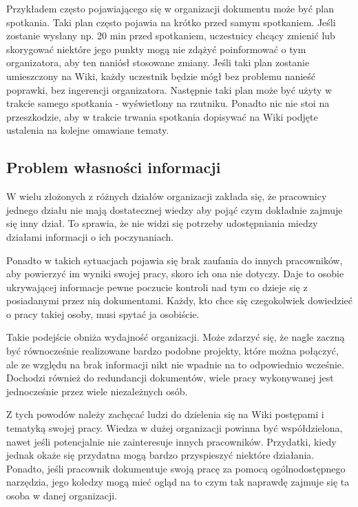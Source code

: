 \documentclass{article}
\begin{document}
	Przykładem często pojawiającego się w organizacji dokumentu może być plan spotkania. Taki plan często pojawia na krótko przed samym spotkaniem. Jeśli zostanie wysłany np. 20 min przed spotkaniem, uczestnicy chcący zmienić lub skorygować niektóre jego punkty mogą nie zdążyć poinformować o tym organizatora, aby ten naniósł stosowane zmiany. Jeśli taki plan zostanie umieszczony na Wiki, każdy uczestnik będzie mógł bez problemu nanieść poprawki, bez ingerencji organizatora. Następnie taki plan może być użyty w trakcie samego spotkania - wyświetlony na rzutniku. Ponadto nic nie stoi na przeszkodzie, aby w trakcie trwania spotkania dopisywać na Wiki podjęte ustalenia na kolejne omawiane tematy.   
	
	\subsection{Problem własności informacji}

	W wielu złożonych z różnych działów organizacji zakłada się, że pracownicy jednego działu nie mają dostatecznej wiedzy aby pojąć czym dokładnie zajmuje się inny dział. To sprawia, że nie widzi się potrzeby udostępniania miedzy działami informacji o ich poczynaniach. 

	Ponadto w takich sytuacjach pojawia się brak zaufania do innych pracowników, aby powierzyć im wyniki swojej pracy, skoro ich ona nie dotyczy. Daje to osobie ukrywającej informacje pewne poczucie kontroli nad tym co dzieje się z posiadanymi przez nią dokumentami. Każdy, kto chce się czegokolwiek dowiedzieć o pracy takiej osoby, musi spytać ja osobiście. 

	Takie podejście obniża wydajność organizacji. Może zdarzyć się, że nagle zaczną być równocześnie realizowane bardzo podobne projekty, które można połączyć, ale ze względu na brak informacji nikt nie wpadnie na to odpowiednio wcześnie. Dochodzi również do redundancji dokumentów, wiele pracy wykonywanej jest jednocześnie przez wiele niezależnych osób.

	Z tych powodów należy zachęcać ludzi do dzielenia się na Wiki postępami i tematyką swojej pracy. Wiedza w dużej organizacji powinna być współdzielona, nawet jeśli potencjalnie nie zainteresuje innych pracowników. Przydatki, kiedy jednak okaże się przydatna mogą bardzo przyspieszyć niektóre działania. Ponadto, jeśli pracownik dokumentuje swoją pracę za pomocą ogólnodostępnego narzędzia, jego koledzy mogą mieć ogląd na to czym tak naprawdę zajmuje się ta osoba w danej organizacji. 
\end{document}
